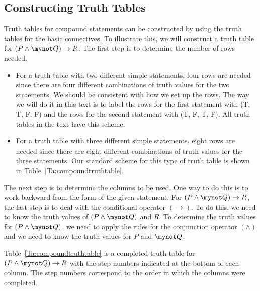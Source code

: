 \subsection*{Constructing Truth Tables}
Truth tables for compound statements can be constructed by using the truth tables for the basic connectives.  To illustrate this, we will construct a truth table for  
$\left( {P \wedge \mynot  Q} \right) \to R$.  The first step is to determine the number of rows needed.
\begin{itemize}
  \item For a truth table with two different simple statements, four rows are needed  since there are four different combinations of truth values for the two statements.  We should be consistent with how we set up the rows.  The way we will do it in this text is to label the rows for the first statement with (T, T, F, F) and the rows for the second statement with (T, F, T, F).  All truth tables in the text have this scheme.

  \item For a truth table with three different simple statements, eight rows are needed  since there are eight different combinations of truth values for the three statements.  Our standard scheme for this type of truth table is shown in 
Table~\ref{Ta:compoundtruthtable}.
\end{itemize}


The next step is to determine the columns to be used.  One way to do this is to work backward from the form of the given statement.  For $\left( {P \wedge \mynot  Q} \right) \to R$, the last step is to deal with the conditional operator $\left(  \to  \right)$.  To do this, we need to know the truth values of  $\left( {P \wedge \mynot  Q} \right)$ and  $R$.  To determine the truth values for  $\left( {P \wedge \mynot  Q} \right)$, we need to apply the rules for the conjunction operator $\left(  \wedge  \right)$ and we need to know the truth values for  $P$  and  $\mynot  Q$.

Table~\ref{Ta:compoundtruthtable} is a  completed truth table for  
$\left( {P \wedge \mynot  Q} \right) \to R$ with the step numbers indicated at the bottom of each column.  The step numbers correspond to the order in which the columns were completed.

